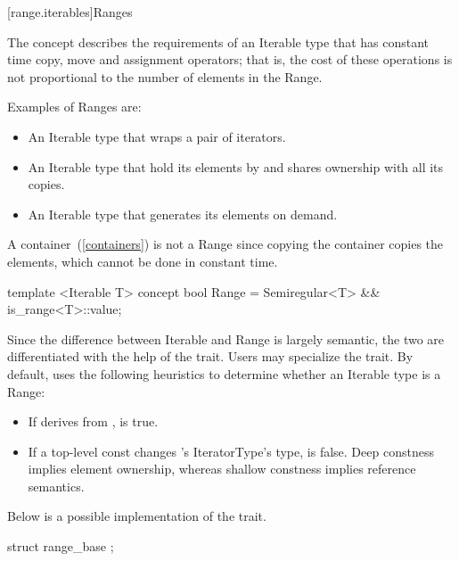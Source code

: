 \begin{addedblock}
[range.iterables]{Ranges}

\pnum
The  concept describes the requirements of an Iterable type that
has constant time copy, move and assignment operators; that is, the cost of
these operations is not proportional to the number of elements in the Range.

\pnum
\enterexample
Examples of Ranges are:

\begin{itemize}
\item An Iterable type that wraps a pair of iterators.

\item An Iterable type that hold its elements by 
and shares ownership with all its copies.

\item An Iterable type that generates its elements on demand.
\end{itemize}

A container~(\ref{containers}) is not a Range since copying the
container copies the elements, which cannot be done in constant time.
\exitexample

\begin{codeblock}
template <Iterable T>
concept bool Range =
  Semiregular<T> && is_range<T>::value;
\end{codeblock}

\pnum
Since the difference between Iterable and Range is largely semantic, the
two are differentiated with the help of the  trait. Users may
specialize the  trait. By default,  uses the
following heuristics to determine whether an Iterable type  is a Range:

\begin{itemize}
\item If  derives from , 
is true.
\item If a top-level const changes 's IteratorType's
 type, 
is false. \enternote Deep constness implies element ownership, whereas shallow
constness implies reference semantics. \exitnote
\end{itemize}

\pnum
\enternote
Below is a possible implementation of the  trait.

\begin{codeblock}
struct range_base
{};


\end{codeblock}
\end{addedblock}
